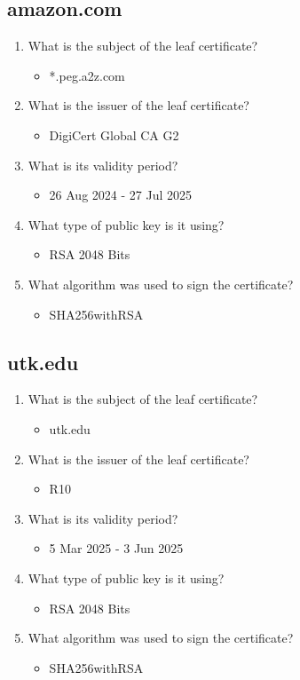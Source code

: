 \documentclass[11pt]{article}
\begin{document}
\subsection{amazon.com}
\label{sec:orgef704e2}
\begin{enumerate}
\item What is the subject of the leaf certificate?
\begin{itemize}
\item *.peg.a2z.com
\end{itemize}
\item What is the issuer of the leaf certificate?
\begin{itemize}
\item DigiCert Global CA G2
\end{itemize}
\item What is its validity period?
\begin{itemize}
\item 26 Aug 2024 - 27 Jul 2025
\end{itemize}
\item What type of public key is it using?
\begin{itemize}
\item RSA 2048 Bits
\end{itemize}
\item What algorithm was used to sign the certificate?
\begin{itemize}
\item SHA256withRSA
\end{itemize}
\end{enumerate}
\subsection{utk.edu}
\label{sec:orgce8069e}
\begin{enumerate}
\item What is the subject of the leaf certificate?
\begin{itemize}
\item utk.edu
\end{itemize}
\item What is the issuer of the leaf certificate?
\begin{itemize}
\item R10
\end{itemize}
\item What is its validity period?
\begin{itemize}
\item 5 Mar 2025 - 3 Jun 2025
\end{itemize}
\item What type of public key is it using?
\begin{itemize}
\item RSA 2048 Bits
\end{itemize}
\item What algorithm was used to sign the certificate?
\begin{itemize}
\item SHA256withRSA
\end{itemize}
\end{enumerate}
\end{document}
